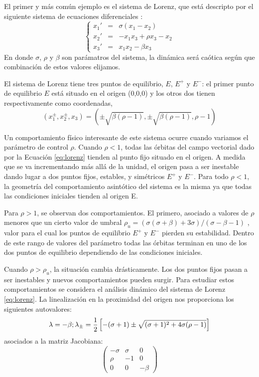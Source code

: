 El primer y más común ejemplo es el sistema de Lorenz, que está descripto por el siguiente sistema de ecuaciones diferenciales \cite{Lorenz1963}:
\begin{equation}\label{eq:lorenz}
\left \{
\begin{array}{rcl}
x_1' &=& \sigma (x_1-x_2)\\
x_2' &=& -x_1x_3+\rho x_3-x_2\\
x_3' &=& x_1x_2-\beta x_3
\end{array}
\right.
\end{equation}
En donde $\sigma$, $\rho$ y $\beta$ son parámatros del sistema, la dinámica será caótica según que combinación de estos valores elijamos.

El sistema de Lorenz tiene tres puntos de equilibrio, $E$, $E^+$ y $E^-$: el primer punto de equilibrio $E$ está situado en el origen (0,0,0) y los otros dos tienen respectivamente como coordenadas,
\begin{equation}
(x_1^\pm,x_2^\pm,x_3)=\left(\pm \sqrt{\beta(\rho-1)},\pm \sqrt{\beta(\rho-1)},\rho - 1\right) \nonumber
\end{equation}


Un comportamiento físico interesante de este sistema ocurre cuando variamos el parámetro de control $\rho$.
Cuando $\rho<1$, todas las órbitas del campo vectorial dado por la Ecuación \ref{eq:lorenz} tienden al punto fijo situado en el origen.
A medida que se va incrementando más allá de la unidad, el origen pasa a ser inestable dando lugar a dos puntos fijos, estables, y simétricos $E^+$ y $E^-$. Para todo $\rho<1$, la geometría del comportamiento asintótico del sistema es la misma ya que todas las condiciones iniciales tienden al origen E.

Para $\rho>1$, se observan dos comportamientos.
El primero, asociado a valores de $\rho$ menores que un cierto valor de umbral $\rho_u=(\sigma(\sigma+\beta)+3\sigma)/(\sigma-\beta-1)$ , valor para el cual los puntos de equilibrio $E^+$ y $E^-$ pierden su estabilidad.
Dentro de este rango de valores del parámetro todas las órbitas terminan en uno de los dos puntos de equilibrio dependiendo de las condiciones iniciales.

Cuando $\rho>\rho_u$, la situación cambia drásticamente.
Los dos puntos fijos pasan a ser inestables y nuevos comportamientos pueden surgir.
Para estudiar estos comportamientos se considera el análisis dinámico del sistema de Lorenz \ref{eq:lorenz}. 
La linealización en la proximidad del origen nos proporciona los siguientes autovalores:
\begin{equation}
\lambda = -\beta;\\
\lambda_\pm = \frac{1}{2} \left[-(\sigma+1) \pm \sqrt{(\sigma+1)^2+4\sigma(\rho-1)} \right] \nonumber
\end{equation}
 asociados a la matriz Jacobiana:
\begin{equation}
\begin{pmatrix}
-\sigma &\sigma &0 \\
\rho &-1 &0 \\
0 &0 &-\beta
\end{pmatrix}
\nonumber
\end{equation}

